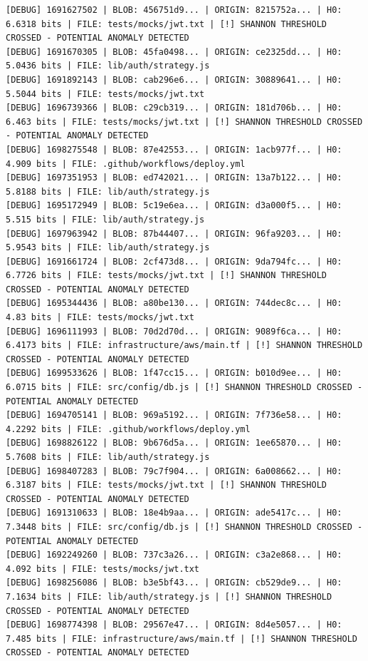 \documentclass[12pt, a4paper, oneside]{report}
\begin{document}
\begin{lstlisting}[basicstyle=\tiny\ttfamily]
[DEBUG] 1691627502 | BLOB: 456751d9... | ORIGIN: 8215752a... | H0: 6.6318 bits | FILE: tests/mocks/jwt.txt | [!] SHANNON THRESHOLD CROSSED - POTENTIAL ANOMALY DETECTED
[DEBUG] 1691670305 | BLOB: 45fa0498... | ORIGIN: ce2325dd... | H0: 5.0436 bits | FILE: lib/auth/strategy.js
[DEBUG] 1691892143 | BLOB: cab296e6... | ORIGIN: 30889641... | H0: 5.5044 bits | FILE: tests/mocks/jwt.txt
[DEBUG] 1696739366 | BLOB: c29cb319... | ORIGIN: 181d706b... | H0: 6.463 bits | FILE: tests/mocks/jwt.txt | [!] SHANNON THRESHOLD CROSSED - POTENTIAL ANOMALY DETECTED
[DEBUG] 1698275548 | BLOB: 87e42553... | ORIGIN: 1acb977f... | H0: 4.909 bits | FILE: .github/workflows/deploy.yml
[DEBUG] 1697351953 | BLOB: ed742021... | ORIGIN: 13a7b122... | H0: 5.8188 bits | FILE: lib/auth/strategy.js
[DEBUG] 1695172949 | BLOB: 5c19e6ea... | ORIGIN: d3a000f5... | H0: 5.515 bits | FILE: lib/auth/strategy.js
[DEBUG] 1697963942 | BLOB: 87b44407... | ORIGIN: 96fa9203... | H0: 5.9543 bits | FILE: lib/auth/strategy.js
[DEBUG] 1691661724 | BLOB: 2cf473d8... | ORIGIN: 9da794fc... | H0: 6.7726 bits | FILE: tests/mocks/jwt.txt | [!] SHANNON THRESHOLD CROSSED - POTENTIAL ANOMALY DETECTED
[DEBUG] 1695344436 | BLOB: a80be130... | ORIGIN: 744dec8c... | H0: 4.83 bits | FILE: tests/mocks/jwt.txt
[DEBUG] 1696111993 | BLOB: 70d2d70d... | ORIGIN: 9089f6ca... | H0: 6.4173 bits | FILE: infrastructure/aws/main.tf | [!] SHANNON THRESHOLD CROSSED - POTENTIAL ANOMALY DETECTED
[DEBUG] 1699533626 | BLOB: 1f47cc15... | ORIGIN: b010d9ee... | H0: 6.0715 bits | FILE: src/config/db.js | [!] SHANNON THRESHOLD CROSSED - POTENTIAL ANOMALY DETECTED
[DEBUG] 1694705141 | BLOB: 969a5192... | ORIGIN: 7f736e58... | H0: 4.2292 bits | FILE: .github/workflows/deploy.yml
[DEBUG] 1698826122 | BLOB: 9b676d5a... | ORIGIN: 1ee65870... | H0: 5.7608 bits | FILE: lib/auth/strategy.js
[DEBUG] 1698407283 | BLOB: 79c7f904... | ORIGIN: 6a008662... | H0: 6.3187 bits | FILE: tests/mocks/jwt.txt | [!] SHANNON THRESHOLD CROSSED - POTENTIAL ANOMALY DETECTED
[DEBUG] 1691310633 | BLOB: 18e4b9aa... | ORIGIN: ade5417c... | H0: 7.3448 bits | FILE: src/config/db.js | [!] SHANNON THRESHOLD CROSSED - POTENTIAL ANOMALY DETECTED
[DEBUG] 1692249260 | BLOB: 737c3a26... | ORIGIN: c3a2e868... | H0: 4.092 bits | FILE: tests/mocks/jwt.txt
[DEBUG] 1698256086 | BLOB: b3e5bf43... | ORIGIN: cb529de9... | H0: 7.1634 bits | FILE: lib/auth/strategy.js | [!] SHANNON THRESHOLD CROSSED - POTENTIAL ANOMALY DETECTED
[DEBUG] 1698774398 | BLOB: 29567e47... | ORIGIN: 8d4e5057... | H0: 7.485 bits | FILE: infrastructure/aws/main.tf | [!] SHANNON THRESHOLD CROSSED - POTENTIAL ANOMALY DETECTED

\end{lstlisting}
\end{document}
